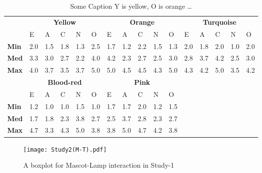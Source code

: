 \begin{table}[H]
    \renewcommand{\arraystretch}{1.2}
    \caption{Some Caption Y is yellow, O is orange \ldots}
    \label{table:medianMT2}
    \begin{center}
        \begin{tabular}{p{}|
        p{}|p{}|p{}|p{}|p{}||
        p{}|p{}|p{}|p{}|p{}||
        p{}|p{}|p{}|p{}|p{}|}
            \cline{2-16}
            & \multicolumn{5}{c||}{\textbf{Yellow}} & \multicolumn{5}{c||}{\textbf{Orange}}
            & \multicolumn{5}{c|}{\textbf{Turquoise}} \\
            \cline{2-16}
            & E & A & C & N & O  			    & E & A & C & N & O   	 	& E & A & C & N & O      \\
            \cline{2-16}
            \textbf{Min}  	& 2.0 & 1.5 & 1.8 & 1.3 & 2.5 		& 1.7 & 1.2 & 2.2 & 1.5 & 1.3  	& 2.0 & 1.8 & 2.0 & 1.0 & 2.0  \\
            \textbf{Med} 	& 3.3 & 3.0 & 2.7 & 2.2 & 4.0 		& 4.2 & 2.3 & 2.7 & 2.5 & 3.0  	& 2.8 & 3.7 & 4.2 & 2.5 & 3.0  \\
            \textbf{Max}	& 4.0 & 3.7 & 3.5 & 3.7 & 5.0 		& 5.0 & 4.5 & 4.5 & 4.3 & 5.0  	& 4.3 & 4.2 & 5.0 & 3.5 & 4.2 \\
            \cline{2-16}
            \cline{2-11}
            &  \multicolumn{5}{|c||}{\textbf{Blood-red}} & \multicolumn{5}{|c||}{\textbf{Pink}} \\
            \cline{2-11}
            & E & A & C & N & O  			& E & A & C & N & O     		\\
            \cline{2-11}
            \textbf{Min} 	& 1.2 & 1.0 & 1.0 & 1.5 & 1.0 		& 1.7 & 1.7 & 2.0 & 1.2 & 1.5 	\\
            \textbf{Med}    & 1.7 & 1.8 & 2.3 & 3.8 & 2.7 	    & 2.5 & 3.7 & 2.8 & 2.3 & 2.7 	\\
            \textbf{Max}  	& 4.7 & 3.3 & 4.3 & 5.0 & 3.8 		& 3.8 & 5.0 & 4.7 & 4.2 & 3.8  	\\
            \cline{2-11}
        \end{tabular}
    \end{center}
\end{table}

\begin{figure}[H]
    \centering
    \texttt{[image: Study2(M-T).pdf]}
    \caption{A boxplot for Mascot-Lamp interaction in Study-1}
    \label{fig:MT2}
\end{figure}

